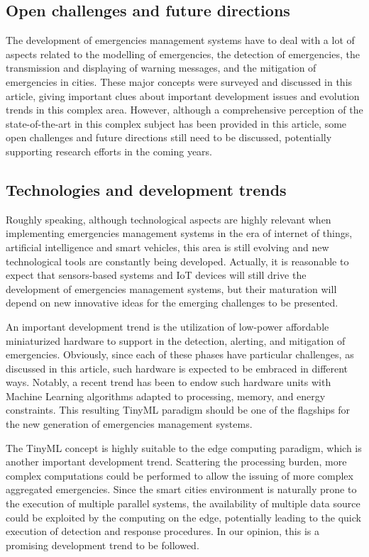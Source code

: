 \begin{refsection}
\section{Open challenges and future directions}\label{sec7}

The development of emergencies management systems have to deal with a lot of aspects related to the modelling of emergencies, the detection of emergencies, the transmission and displaying of warning messages, and the mitigation of emergencies in cities. These major concepts were surveyed and discussed in this article, giving important clues about important development issues and evolution trends in this complex area. However, although a comprehensive perception of the state-of-the-art in this complex subject has been provided in this article, some open challenges and future directions still need to be discussed, potentially supporting research efforts in the coming years.

\subsection{Technologies and development trends}

Roughly speaking, although technological aspects are highly relevant when implementing emergencies management systems in the era of internet of things, artificial intelligence and smart vehicles, this area is still evolving and new technological tools are constantly being developed. Actually, it is reasonable to expect that sensors-based systems and IoT devices will still drive the development of emergencies management systems, but their maturation will depend on new innovative ideas for the emerging challenges to be presented.

An important development trend is the utilization of low-power affordable miniaturized hardware to support in the detection, alerting, and mitigation of emergencies. Obviously, since each of these phases have particular challenges, as discussed in this article, such hardware is expected to be embraced in different ways. Notably, a recent trend has been to endow such hardware units with Machine Learning algorithms adapted to processing, memory, and energy constraints. This resulting TinyML paradigm should be one of the flagships for the new generation of emergencies management systems. 

The TinyML concept is highly suitable to the edge computing paradigm, which is another important development trend. Scattering the processing burden, more complex computations could be performed to allow the issuing of more complex aggregated emergencies. Since the smart cities environment is naturally prone to the execution of multiple parallel systems, the availability of multiple data source could be exploited by the computing on the edge, potentially leading to the quick execution of detection and response procedures. In our opinion, this is a promising development trend to be followed.


\end{refsection}
